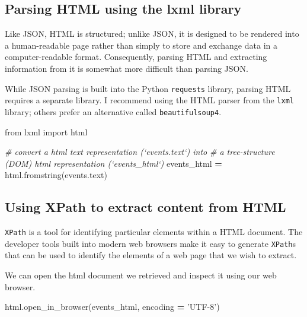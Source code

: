 \documentclass[]{book}
\newenvironment{Shaded}{\begin{snugshade}}{\end{snugshade}}
\newcommand{\CommentTok}[1]{\textcolor[rgb]{0.56,0.35,0.01}{\textit{#1}}}
\newcommand{\ImportTok}[1]{#1}
\newcommand{\NormalTok}[1]{#1}
\newcommand{\OperatorTok}[1]{\textcolor[rgb]{0.81,0.36,0.00}{\textbf{#1}}}
\newcommand{\StringTok}[1]{\textcolor[rgb]{0.31,0.60,0.02}{#1}}
\begin{document}
\hypertarget{parsing-html-using-the-lxml-library}{%
\subsection{Parsing HTML using the lxml library}\label{parsing-html-using-the-lxml-library}}

Like JSON, HTML is structured; unlike JSON, it is designed to be rendered into a human-readable page rather than simply to store and exchange data in a computer-readable format. Consequently, parsing HTML and extracting information from it is somewhat more difficult than parsing JSON.

While JSON parsing is built into the Python \texttt{requests} library, parsing HTML requires a separate library. I recommend using the HTML parser from the \texttt{lxml} library; others prefer an alternative called \texttt{beautifulsoup4}.

\begin{Shaded}
\begin{Highlighting}[]
\ImportTok{from}\NormalTok{ lxml }\ImportTok{import}\NormalTok{ html}

\CommentTok{# convert a html text representation (`events.text`) into }
\CommentTok{# a tree-structure (DOM) html representation (`events_html`)}
\NormalTok{events_html }\OperatorTok{=}\NormalTok{ html.fromstring(events.text)}
\end{Highlighting}
\end{Shaded}

\hypertarget{using-xpath-to-extract-content-from-html}{%
\subsection{Using XPath to extract content from HTML}\label{using-xpath-to-extract-content-from-html}}

\texttt{XPath} is a tool for identifying particular elements within a HTML document. The developer tools built into modern web browsers make it easy to generate \texttt{XPath}s that can be used to identify the elements of a web page that we wish to extract.

We can open the html document we retrieved and inspect it using our web browser.

\begin{Shaded}
\begin{Highlighting}[]
\NormalTok{html.open_in_browser(events_html, encoding }\OperatorTok{=} \StringTok{'UTF-8'}\NormalTok{)}
\end{Highlighting}
\end{Shaded}
\end{document}

